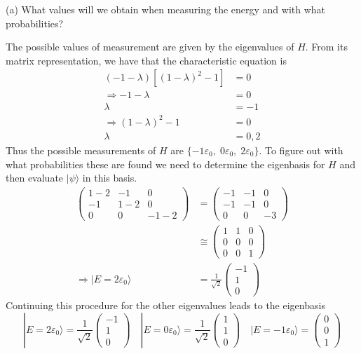 \documentclass[a4paper, 11pt]{article}
\newcommand{\ket}[1]{|#1\rangle}
\newenvironment{solution}{%
	\begin{list}{}{%
			\setlength{\topsep}{0pt}%
			\setlength{\leftmargin}{1.5cm}%
			\setlength{\rightmargin}{1.5cm}%
			\setlength{\listparindent}{\parindent}%
			\setlength{\itemindent}{\parindent}%
			\setlength{\parsep}{\parskip}%
		}%
		\item[]}{\end{list}}
\begin{document}
\noindent (a) What values will we obtain when measuring the energy and with what probabilities? \\
	\begin{solution}
		\noindent The possible values of measurement are given by the eigenvalues of $H$. From its matrix representation, we have that the characteristic equation is 
			\begin{align*}
				(-1-\lambda)[(1-\lambda)^2-1] &= 0 \\  
				\Rightarrow -1-\lambda &= 0 \\ 
					\lambda &= -1 \\ 
				\Rightarrow (1-\lambda)^2 - 1 &= 0 \\ 
					\lambda &= 0, 2
			\end{align*}
		Thus the possible measurements of $H$ are $\{-1\varepsilon_0,\; 0\varepsilon_0,\; 2\varepsilon_0\}$. To figure out with what probabilities these are found we need to determine the eigenbasis for $H$ and then evaluate $\ket{\psi}$ in this basis. 
			\begin{align*}
				\begin{pmatrix} 1-2 & -1 & 0 \\ -1 & 1-2 & 0 \\ 0 & 0 & -1-2 \end{pmatrix} &= \begin{pmatrix} -1 & -1 & 0 \\ -1 & -1 & 0 \\ 0 & 0 & -3 \end{pmatrix} \\
				&\cong \begin{pmatrix}1 & 1 & 0 \\ 0 & 0 & 0 \\ 0 & 0 & 1 \end{pmatrix} \\
				\Rightarrow \ket{E=2\varepsilon_0} &= \frac{1}{\sqrt{2}}\begin{pmatrix} -1 \\ 1 \\ 0\end{pmatrix}
			\end{align*}
		Continuing this procedure for the other eigenvalues leads to the eigenbasis
			\begin{equation*}
				\ket{E=2\varepsilon_0} = \frac{1}{\sqrt{2}}\begin{pmatrix}-1 \\ 1 \\ 0\end{pmatrix} \quad \ket{E=0\varepsilon_0} = \frac{1}{\sqrt{2}}\begin{pmatrix}1 \\ 1 \\ 0\end{pmatrix} \quad \ket{E=-1\varepsilon_0} = \begin{pmatrix} 0 \\ 0 \\ 1\end{pmatrix}

\end{equation*}
\end{solution}
\end{document}
